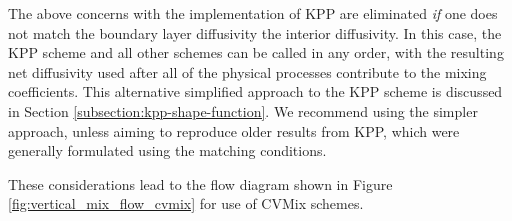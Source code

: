 The above concerns with the \cite{LargeKPP} implementation of KPP are
eliminated {\it if} one does not match the boundary layer diffusivity
the interior diffusivity.  In this case, the KPP scheme and all other
schemes can be called in any order, with the resulting net diffusivity
used after all of the physical processes contribute to the mixing
coefficients.  This alternative simplified approach to the KPP scheme
is discussed in Section \ref{subsection:kpp-shape-function}.  We
recommend using the simpler approach, unless aiming to reproduce older
results from KPP, which were generally formulated using the
\cite{LargeKPP} matching conditions.

These considerations lead to the flow diagram shown in Figure
\ref{fig:vertical_mix_flow_cvmix} for use of CVMix schemes.

